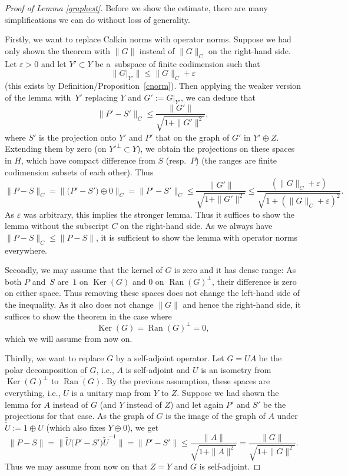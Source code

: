 \documentclass[10pt,a4paper]{amsart}
\DeclareMathOperator{\Ker}{Ker}
\DeclareMathOperator{\Ran}{Ran}
\begin{document}
	\begin{proof}[Proof of Lemma \ref{graphest}]
		Before we show the estimate, there are many simplifications we can do without loss of generality.

		Firstly, we want to replace Calkin norms with operator norms. Suppose we had only shown the theorem with $\|G\|$ instead of $\|G\|_C$ on the right-hand side. Let $\varepsilon >0$ and let $Y'\subset Y$ be a~subspace of finite codimension such that
		\[\|G|_{Y'}\|\leq\|G\|_C+\varepsilon\]
		(this exists by Definition/Proposition~\ref{cnorm}). Then applying the weaker version of the lemma with~$Y'$ replacing $Y$ and $G':=G|_{Y'}$, we can deduce that
		\[\bigl\|P'-S'\bigr\|_C\leq \frac{\|G'\|}{\sqrt{1+\|G'\|^2}},\]
		where $S'$ is the projection onto $Y'$ and $P'$ that on the graph of $G'$ in $Y'\oplus Z$. Extending them by zero \big(on $Y'^\bot\subset Y$\big), we obtain the projections on these spaces in $H$, which have compact difference from $S$ (resp.\ $P$) (the ranges are finite codimension subsets of each other).
		Thus
		\[\|P-S\|_C=\bigl\|\bigl(P'-S'\bigr)\oplus 0\bigr\|_C=\bigl\|P'-S'\bigr\|_C\leq \frac{\|G'\|}{\sqrt{1+\|G'\|^2}}\leq \frac{(\|G\|_C+\varepsilon)}{\sqrt{1+(\|G\|_C+\varepsilon)^2}}.\]
		As $\varepsilon$ was arbitrary, this implies the stronger lemma. Thus it suffices to show the lemma without the subscript $C$ on the right-hand side. As we always have $\|P-S\|_C\leq \|P-S\|$, it is sufficient to show the lemma with operator norms everywhere.
		
		Secondly, we may assume that the kernel of $G$ is zero and it has dense range: As both $P$ and~$S$ are~$1$ on $\Ker(G)$ and $0$ on $\Ran(G)^\bot$, their difference is zero on either space. Thus removing these spaces does not change the left-hand side of the inequality. As it also does not change $\|G\|$ and hence the right-hand side, it suffices to show the theorem in the case where
\[
\Ker(G)=\Ran(G)^\bot=0,
\]
		which we will assume from now on.

		Thirdly, we want to replace $G$ by a self-adjoint operator. Let $G=UA$ be the polar decomposition of $G$, i.e., $A$ is self-adjoint and $U$ is an isometry from $\Ker(G)^\bot$ to $\overline{\Ran(G)}$. By the previous assumption, these spaces are everything, i.e., $U$ is a unitary map from $Y$ to $Z$. Suppose we had shown the lemma for $A$ instead of $G$ (and $Y$ instead of $Z$) and let again $P'$ and $S'$ be the projections for that case. As the graph of $G$ is the image of the graph of $A$ under $\tilde U:=1\oplus U$ (which also fixes $Y\oplus 0$), we get
		\[
        \|P-S\|=\bigl\|\tilde U\bigl(P'-S'\bigr)\tilde U^{-1}\bigr\|=\bigl\|P'-S'\bigr\|\leq \frac{\|A\|}{\sqrt{1+\|A\|^2}}=\frac{\|G\|}{\sqrt{1+\|G\|^2}}.
        \]
		Thus we may assume from now on that $Z=Y$ and $G$ is self-adjoint.


\end{proof}
\end{document}
